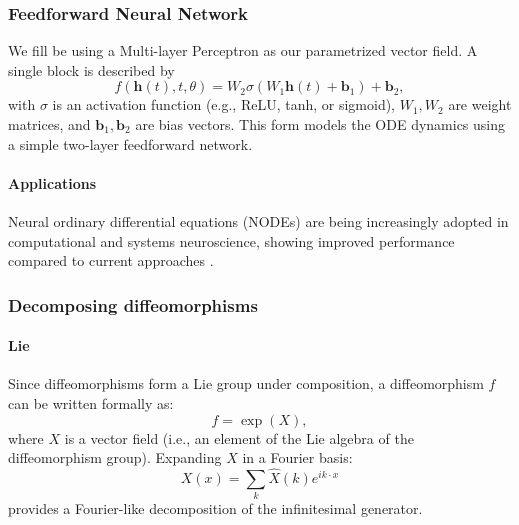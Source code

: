\documentclass{article}
\theoremstyle{definition} \newtheorem{definition}{Definition}  \newtheorem{example}{Example}
\theoremstyle{remark} \newtheorem{remark}{Remark}
\newcounter{ct}
\begin{document}
\subsubsection{Feedforward Neural Network}\label{sec:fnn}
We fill be using a Multi-layer Perceptron as our parametrized vector field. 
A single block is described by
\[
f(\mathbf{h}(t), t, \theta) = W_2 \sigma(W_1 \mathbf{h}(t) + \mathbf{b}_1) + \mathbf{b}_2,
\]
with \( \sigma \) is an activation function (e.g., ReLU, tanh, or sigmoid), \( W_1, W_2 \) are weight matrices, and \( \mathbf{b}_1, \mathbf{b}_2 \) are bias vectors.
This form models the ODE dynamics using a simple two-layer feedforward network.





\paragraph{Applications}
Neural ordinary differential equations (NODEs) are being increasingly adopted in computational and systems neuroscience, showing improved performance compared to current approaches \citep{kim2021inferring,geenjaar2023learning,sedler2023expressive,elgazzar2024universal,rubanova2019latent,coelho2024enhancing}.









\subsubsection{Decomposing diffeomorphisms}\label{sec:diff_dec}
\paragraph{Lie}
Since diffeomorphisms form a Lie group under composition, a diffeomorphism 
\( f \) can be written formally as:
\[
f = \exp(X),
\]
where \( X \) is a vector field (i.e., an element of the Lie algebra of the diffeomorphism group).
Expanding \( X \) in a Fourier basis:
\[
X(x) = \sum_k \hat{X}(k) e^{i k \cdot x}
\]
provides a Fourier-like decomposition of the infinitesimal generator.
\end{document}
